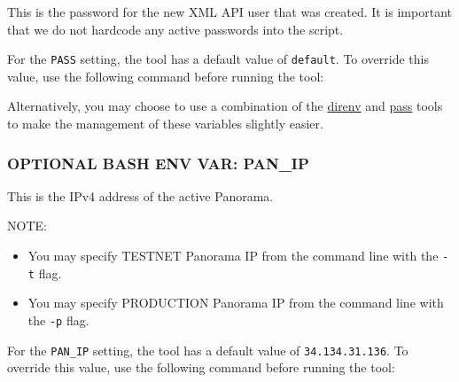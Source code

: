 \documentclass[
]{article}
\newenvironment{Shaded}{}{}
\newcommand{\BuiltInTok}[1]{#1}
\newcommand{\CommentTok}[1]{\textcolor[rgb]{0.38,0.63,0.69}{\textit{#1}}}
\newcommand{\FunctionTok}[1]{\textcolor[rgb]{0.02,0.16,0.49}{#1}}
\newcommand{\KeywordTok}[1]{\textcolor[rgb]{0.00,0.44,0.13}{\textbf{#1}}}
\newcommand{\NormalTok}[1]{#1}
\newcommand{\StringTok}[1]{\textcolor[rgb]{0.25,0.44,0.63}{#1}}
\newcommand{\VariableTok}[1]{\textcolor[rgb]{0.10,0.09,0.49}{#1}}
\providecommand{\tightlist}{%
  \setlength{\itemsep}{0pt}\setlength{\parskip}{0pt}}
\begin{document}
This is the password for the new XML API user that was created. It is
important that we do not hardcode any active passwords into the script.

For the \texttt{PASS} setting, the tool has a default value of
\texttt{default}. To override this value, use the following command
before running the tool:

\begin{Shaded}
\end{Shaded}

Alternatively, you may choose to use a combination of the
\href{https://direnv.net/}{direnv} and
\href{https://www.passwordstore.org/}{pass} tools to make the management
of these variables slightly easier.

\hypertarget{optional-bash-env-var-pan_ip}{%
\subsubsection{OPTIONAL BASH ENV VAR:
PAN\_IP}\label{optional-bash-env-var-pan_ip}}

This is the IPv4 address of the active Panorama.

NOTE:

\begin{itemize}
\tightlist
\item
  You may specify TESTNET Panorama IP from the command line with the
  \texttt{-t} flag.
\item
  You may specify PRODUCTION Panorama IP from the command line with the
  \texttt{-p} flag.
\end{itemize}

For the \texttt{PAN\_IP} setting, the tool has a default value of
\texttt{34.134.31.136}. To override this value, use the following
command before running the tool:

\begin{Shaded}
\end{Shaded}
\end{document}
